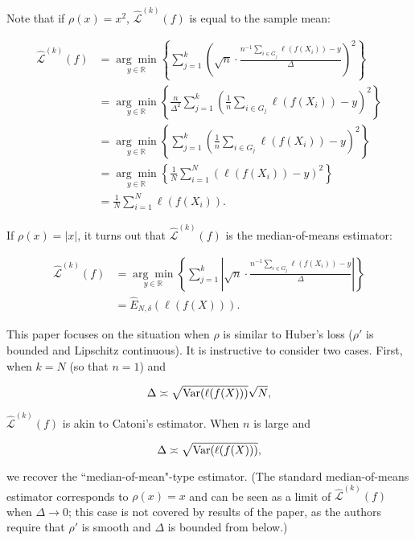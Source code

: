 \begin{remark}

Note that if \(\rho(x) = x^2\), \(\hat{\mathcal{L}}^{(k)} (f)\) is equal to the sample mean:

\begin{align*}
\hat{\mathcal{L}}^{(k)} (f)  &  = \underset{y \in \mathbb{R}}{\arg \min} \left\{ \sum_{j=1}^k \left( \sqrt{n} \cdot\frac{n^{-1} \sum_{i \in G_j} \ell(f(X_i)) -y}{\Delta} \right)^2\right\}
\\ &  =   \underset{y \in \mathbb{R}}{\arg \min} \left\{\frac{n}{\Delta^2} \sum_{j=1}^k\left( \frac{1}{n} \sum_{i \in G_j} \ell(f(X_i)) -y \right)^2\right\}
\\ &  =   \underset{y \in \mathbb{R}}{\arg \min} \left\{ \sum_{j=1}^k\left( \frac{1}{n} \sum_{i \in G_j} \ell(f(X_i)) -y \right)^2\right\}
\\ &  =   \underset{y \in \mathbb{R}}{\arg \min} \left\{  \frac{1}{N} \sum_{i =1}^N \left( \ell(f(X_i)) -y \right)^2\right\}
\\ & = \frac{1}{N} \sum_{i =1}^N \ell(f(X_i)).
\end{align*}

If \(\rho(x) = |x|\), it turns out that \(\hat{\mathcal{L}}^{(k)} (f)\) is the median-of-means estimator:

\begin{align*}
\hat{\mathcal{L}}^{(k)} (f)  &  = \underset{y \in \mathbb{R}}{\arg \min} \left\{ \sum_{j=1}^k \left| \sqrt{n} \cdot\frac{n^{-1} \sum_{i \in G_j} \ell(f(X_i)) -y}{\Delta} \right|\right\}
\\ & = \hat{E}_{N, \delta}\left( \ell(f(X)) \right).
\end{align*}

This paper focuses on the situation when \(\rho\) is similar to Huber's loss (\(\rho'\) is bounded and Lipschitz continuous). It is instructive to consider two cases. First, when \(k = N\) (so that \(n=1\)) and

\[
\Delta \asymp \sqrt{ \mathrm{Var}(\ell(f(X)))} \sqrt{N},
\]

\(\hat{\mathcal{L}}^{(k)}(f)\) is akin to Catoni's estimator. When \(n\) is large and

\[
\Delta \asymp \sqrt{ \mathrm{Var}(\ell(f(X)))},
\]

we recover the ``median-of-mean"-type estimator. (The standard median-of-means estimator corresponds to \(\rho(x)= x\) and can be seen as a limit of \(\hat{\mathcal{L}}^{(k)}(f)\) when \(\Delta \to 0\); this case is not covered by results of the paper, as the authors require that \(\rho'\) is smooth and \(\Delta\) is bounded from below.)

\end{remark}

